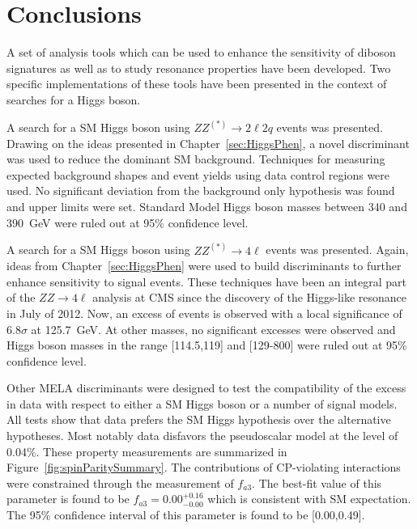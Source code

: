 \chapter{Conclusions}
\label{sec:Conclusions}

A set of analysis tools which can be used to enhance the
sensitivity of diboson signatures as well as to study resonance
properties have been developed.  Two specific implementations 
of these tools have been presented in the context of searches
for a Higgs boson. 

A search for a SM Higgs boson using $ZZ^{(*)}\to2\ell2q$ events
was presented.  
Drawing on the ideas presented in Chapter~\ref{sec:HiggsPhen},
a novel discriminant was used to reduce the dominant SM
background. 
Techniques for measuring expected background
shapes and event yields using data control regions were used.
No significant deviation from the background 
only hypothesis was found and upper limits were set.
Standard Model Higgs boson masses between 340 and 390~GeV
were ruled out at 95\% confidence level.

A search for a SM Higgs boson using $ZZ^{(*)}\to4\ell$ events
was presented.  Again, ideas from Chapter~\ref{sec:HiggsPhen} 
were used to build discriminants to further enhance sensitivity
to signal events.  These techniques have been an integral part
of the $ZZ\to4\ell$ analysis at CMS since the discovery of the 
Higgs-like resonance in July of 2012.  
Now, an excess of events is observed with a local significance
of $6.8\sigma$ at 125.7~GeV.  
At other masses, no significant excesses were observed 
and Higgs boson masses in the range [114.5,119] and [129-800]
were ruled out at 95\% confidence level. 

Other MELA discriminants were designed to test the
compatibility of the excess in data with respect to either
a SM Higgs boson or a number of signal models.  All 
tests show that data prefers the SM Higgs hypothesis over
the alternative hypotheses.  Most notably data disfavors the 
pseudoscalar model at the level of 0.04\%.  These property
measurements are summarized in Figure~\ref{fig:spinParitySummary}.
The contributions of CP-violating 
interactions were constrained through the measurement of $f_{a3}$.
The best-fit value of this parameter is found to be 
$f_{a3}=0.00^{+0.16}_{-0.00}$ which is consistent with SM expectation.  The 95\% confidence interval of this parameter is found to be 
[0.00,0.49].

